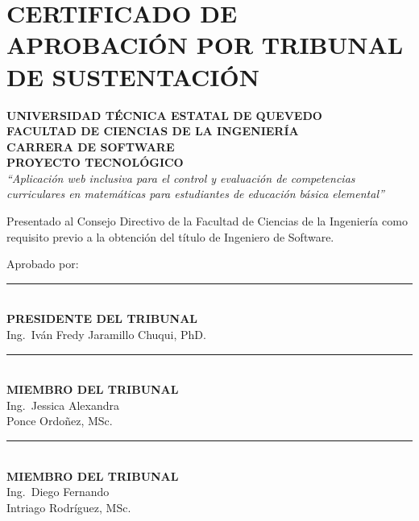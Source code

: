 \documentclass[12pt,a4paper,oneside]{report}
\begin{document}
\vspace{1cm}

\begin{center}
\end{center}

\clearpage

\chapter*{CERTIFICADO DE APROBACIÓN POR TRIBUNAL DE SUSTENTACIÓN}

\begin{center}
\textbf{UNIVERSIDAD TÉCNICA ESTATAL DE QUEVEDO}\\
\textbf{FACULTAD DE CIENCIAS DE LA INGENIERÍA}\\
\textbf{CARRERA DE SOFTWARE}\\[1cm]

\textbf{PROYECTO TECNOLÓGICO}\\[0.5cm]

\textit{``Aplicación web inclusiva para el control y evaluación de competencias curriculares en matemáticas para estudiantes de educación básica elemental''}\\[0.8cm]
\end{center}

Presentado al Consejo Directivo de la Facultad de Ciencias de la Ingeniería como requisito previo a la obtención del título de Ingeniero de Software.

\vspace{0.6cm}
Aprobado por:

\vspace{2cm}

\begin{center}
\rule{8cm}{0.5pt}\\
\textbf{PRESIDENTE DEL TRIBUNAL}\\
Ing.\ Iván Fredy Jaramillo Chuqui, PhD.
\end{center}

\vspace{1.8cm}

\noindent\begin{minipage}[t]{0.48\textwidth}
\centering
\rule{6cm}{0.5pt}\\
\textbf{MIEMBRO DEL TRIBUNAL}\\
Ing.\ Jessica Alexandra\\
Ponce Ordoñez, MSc.
\end{minipage}\hfill
\begin{minipage}[t]{0.48\textwidth}
\centering
\rule{6cm}{0.5pt}\\
\textbf{MIEMBRO DEL TRIBUNAL}\\
Ing.\ Diego Fernando\\
Intriago Rodríguez, MSc.
\end{minipage}
\end{document}
